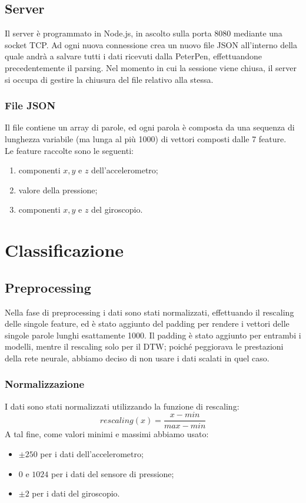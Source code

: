\documentclass[8pt,notitlepage]{report}
\begin{document}
	\section{Server}
		Il server è programmato in Node.js, in ascolto sulla porta 8080 mediante una socket TCP. Ad ogni nuova connessione crea un nuovo file JSON all'interno della quale andrà a salvare tutti i dati ricevuti dalla PeterPen, effettuandone precedentemente il parsing. Nel momento in cui la sessione viene chiusa, il server si occupa di gestire la chiusura del file relativo alla stessa.
		
		\subsection{File JSON}
			Il file contiene un array di parole, ed ogni parola è composta da una sequenza di lunghezza variabile (ma lunga al più 1000) di vettori composti dalle 7 feature. \\
			Le feature raccolte sono le seguenti:
			\begin{enumerate}
				\setlength\itemsep{.1em}
				\item componenti $ x, y $ e $ z $ dell'accelerometro;
				\item valore della pressione;
				\item componenti $ x, y $ e $ z $ del giroscopio.
			\end{enumerate}


\chapter{Classificazione}

	\section{Preprocessing}
		Nella fase di preprocessing i dati sono stati normalizzati, effettuando il rescaling delle singole feature, ed è stato aggiunto del padding per rendere i vettori delle singole parole lunghi esattamente 1000. Il padding è stato aggiunto per entrambi i modelli, mentre il rescaling solo per il DTW; poiché peggiorava le prestazioni della rete neurale, abbiamo deciso di non usare i dati scalati in quel caso. \\
		
		\subsection{Normalizzazione}
			I  dati sono stati normalizzati utilizzando la funzione di rescaling: 
			\[ rescaling(x) = \frac{x - min}{max - min} \]
			A tal fine, come valori minimi e massimi abbiamo usato:
			\begin{itemize}
				\setlength\itemsep{.01em}
				\item $ \pm 250 $ per i dati dell'accelerometro;
				\item $ 0 $ e $ 1024 $ per i dati del sensore di pressione;
				\item $ \pm 2 $ per i dati del giroscopio.
			\end{itemize}
	
\end{document}
